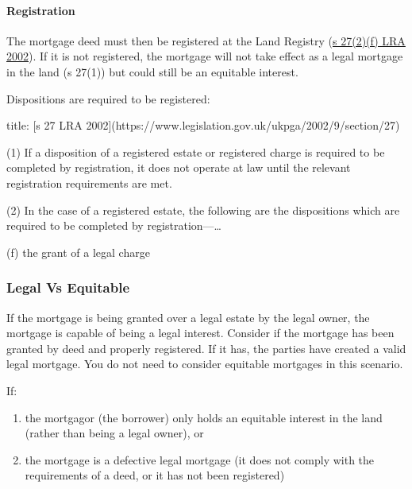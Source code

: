 \documentclass[
]{article}
\newenvironment{Shaded}{}{}
\newcommand{\NormalTok}[1]{#1}
\providecommand{\tightlist}{%
  \setlength{\itemsep}{0pt}\setlength{\parskip}{0pt}}
\begin{document}
\hypertarget{registration}{%
\paragraph{Registration}\label{registration}}

The mortgage deed must then be registered at the Land Registry
(\href{https://www.legislation.gov.uk/ukpga/2002/9/section/27}{s
27(2)(f) LRA 2002}). If it is not registered, the mortgage will not take
effect as a legal mortgage in the land (s 27(1)) but could still be an
equitable interest.

Dispositions are required to be registered:

\begin{Shaded}
\begin{Highlighting}[]
\NormalTok{title: [s 27 LRA 2002](https://www.legislation.gov.uk/ukpga/2002/9/section/27)}

\NormalTok{(1) If a disposition of a registered estate or registered charge is required to be completed by registration, it does not operate at law until the relevant registration requirements are met.}

\NormalTok{(2) In the case of a registered estate, the following are the dispositions which are required to be completed by registration—…}

\NormalTok{(f) the grant of a legal charge}
\end{Highlighting}
\end{Shaded}

\hypertarget{legal-vs-equitable}{%
\subsubsection{Legal Vs Equitable}\label{legal-vs-equitable}}

If the mortgage is being granted over a legal estate by the legal owner,
the mortgage is capable of being a legal interest. Consider if the
mortgage has been granted by deed and properly registered. If it has,
the parties have created a valid legal mortgage. You do not need to
consider equitable mortgages in this scenario.

If:

\begin{enumerate}
\def\labelenumi{\arabic{enumi}.}
\tightlist
\item
  the mortgagor (the borrower) only holds an equitable interest in the
  land (rather than being a legal owner), or
\item
  the mortgage is a defective legal mortgage (it does not comply with
  the requirements of a deed, or it has not been registered)
\end{enumerate}
\end{document}
